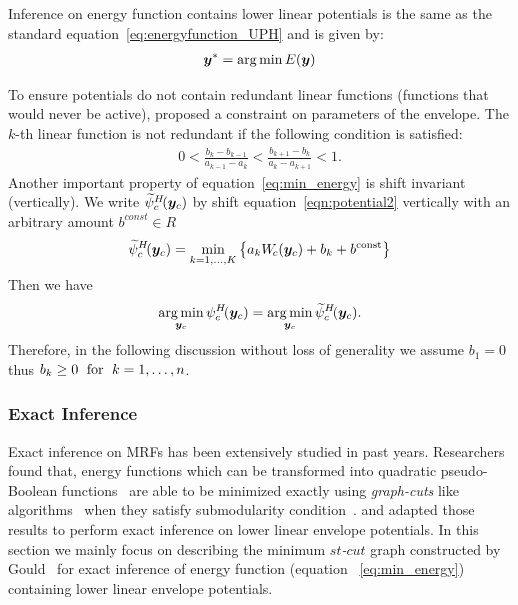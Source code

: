 
Inference on energy function contains lower linear potentials is
the same as the standard equation~\eqref{eq:energyfunction_UPH}
and is given by:
\begin{align}
  \label{eq:min_energy}
  {\bm{y}}^* = \operatorname*{arg\,min}E\!\left({\bm{y}}\right)
\end{align}

To ensure potentials do not contain redundant linear functions
(functions that would never be active), 
proposed a constraint on parameters of the envelope. The $k$-th
linear function is not redundant if the following condition is
satisfied:
%
\begin{align}
    0
    <
    \frac{b_k - b_{k-1}}{a_{k-1} - a_k}
    <
    \frac{b_{k+1} - b_k}{a_k - a_{k+1}}
    <
    1.
  \label{eq:nonredundant}
\end{align}
%
Another important property of equation~\eqref{eq:min_energy} is
shift invariant (vertically). We write
$\widetilde{\psi}^{H}_c\!({\bm{y}}_c)$ by shift
equation~\eqref{eqn:potential2} vertically with an arbitrary
amount $b^{const}\in R$
$$\widetilde{\psi}^{H}_c\!({\bm{y}}_c) = \min_{k=1, \ldots, K}
\left\{a_k W_{\!c}({\bm{y}}_c) + b_k + b^\textrm{const} \right\}$$
%
Then we have
\begin{align}
  \operatorname*{arg\,min}_{{\bm{y}}_c} \psi^H_c\!({\bm{y}}_c)
  = \operatorname*{arg\,min}_{{\bm{y}}_c} \widetilde{\psi}^{H}_c\!({\bm{y}}_c).
  \label{eq:shift_invariant}
\end{align}
%
Therefore, in the following discussion without loss of generality
we assume $b_1 = 0$ thus $b_k\geq0 \text{\; for \;} k=1,\dots,n$.


\subsubsection{Exact Inference}
\label{sec:exact_inference}
Exact inference on MRFs has been extensively studied in past
years. Researchers found that, energy functions which can be
transformed into quadratic pseudo-Boolean
functions~\cite{Ishikawa:PAMI03,Ishikawa:CVPR09,Rother:CVPR09}
are able to be minimized exactly using \emph{graph-cuts} like
algorithms~\cite{Freedman:CVPR05,Hammer:1965} when they satisfy
submodularity condition~\cite{Boros:MATH02}.
 and  adapted those
results to perform exact inference on lower linear envelope
potentials. In this section we mainly focus on describing the minimum \emph{$st$-$cut$} graph constructed by
Gould~\cite{Gould:ICML2011,gouldlearning} for exact
inference of energy function (equation ~\eqref{eq:min_energy}) containing
lower linear envelope potentials.

